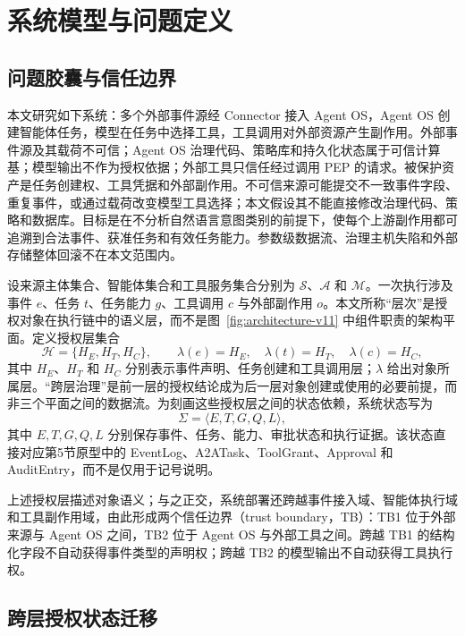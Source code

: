 \section{系统模型与问题定义}\label{sec:problem-v11}

\subsection{问题胶囊与信任边界}

本文研究如下系统：多个外部事件源经 Connector 接入 Agent OS，Agent OS 创建智能体任务，模型在任务中选择工具，工具调用对外部资源产生副作用。外部事件源及其载荷不可信；Agent OS 治理代码、策略库和持久化状态属于可信计算基；模型输出不作为授权依据；外部工具只信任经过调用 PEP 的请求。被保护资产是任务创建权、工具凭据和外部副作用。不可信来源可能提交不一致事件字段、重复事件，或通过载荷改变模型工具选择；本文假设其不能直接修改治理代码、策略和数据库。目标是在不分析自然语言意图类别的前提下，使每个上游副作用都可追溯到合法事件、获准任务和有效任务能力。参数级数据流、治理主机失陷和外部存储整体回滚不在本文范围内。

设来源主体集合、智能体集合和工具服务集合分别为 $\mathcal{S}$、$\mathcal{A}$ 和 $\mathcal{M}$。一次执行涉及事件 $e$、任务 $t$、任务能力 $g$、工具调用 $c$ 与外部副作用 $o$。本文所称“层次”是授权对象在执行链中的语义层，而不是图~\ref{fig:architecture-v11} 中组件职责的架构平面。定义授权层集合
\begin{equation}
\mathcal{H}=\{H_E,H_T,H_C\},\qquad
\lambda(e)=H_E,\quad \lambda(t)=H_T,\quad \lambda(c)=H_C,
\label{eq:authorization-layers-v11}
\end{equation}
其中 $H_E$、$H_T$ 和 $H_C$ 分别表示事件声明、任务创建和工具调用层；$\lambda$ 给出对象所属层。“跨层治理”是前一层的授权结论成为后一层对象创建或使用的必要前提，而非三个平面之间的数据流。为刻画这些授权层之间的状态依赖，系统状态写为
\begin{equation}
\Sigma=\langle E,T,G,Q,L\rangle,
\label{eq:system-state-v11}
\end{equation}
其中 $E,T,G,Q,L$ 分别保存事件、任务、能力、审批状态和执行证据。该状态直接对应第5节原型中的 EventLog、A2ATask、ToolGrant、Approval 和 AuditEntry，而不是仅用于记号说明。

上述授权层描述对象语义；与之正交，系统部署还跨越事件接入域、智能体执行域和工具副作用域，由此形成两个信任边界（trust boundary，TB）：TB1 位于外部来源与 Agent OS 之间，TB2 位于 Agent OS 与外部工具之间。跨越 TB1 的结构化字段不自动获得事件类型的声明权；跨越 TB2 的模型输出不自动获得工具执行权。

\subsection{跨层授权状态迁移}

